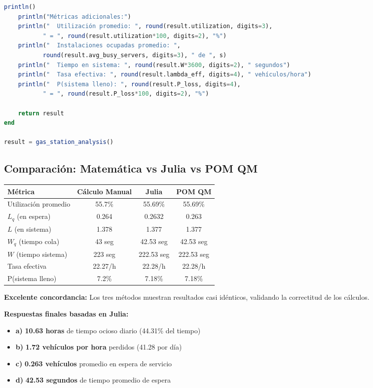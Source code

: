 \documentclass[12pt, a4paper, oneside]{book}
\theoremstyle{definition}
\begin{document}
\begin{center}
\begin{center}
\begin{center}
\begin{lstlisting}[language=Julia]
    println()
    println("Métricas adicionales:")
    println("  Utilización promedio: ", round(result.utilization, digits=3), 
           " = ", round(result.utilization*100, digits=2), "%")
    println("  Instalaciones ocupadas promedio: ", 
           round(result.avg_busy_servers, digits=3), " de ", s)
    println("  Tiempo en sistema: ", round(result.W*3600, digits=2), " segundos")
    println("  Tasa efectiva: ", round(result.lambda_eff, digits=4), " vehículos/hora")
    println("  P(sistema lleno): ", round(result.P_loss, digits=4), 
           " = ", round(result.P_loss*100, digits=2), "%")
    
    return result
end

result = gas_station_analysis()
\end{lstlisting}
\subsection{Comparación: Matemática vs Julia vs POM QM}

\begin{center}
\begin{tabular}{|l|c|c|c|}
\hline
\textbf{Métrica} & \textbf{Cálculo Manual} & \textbf{Julia} & \textbf{POM QM} \\
\hline
Utilización promedio & 55.7\% & 55.69\% & 55.69\% \\
$L_q$ (en espera) & 0.264 & 0.2632 & 0.263 \\
$L$ (en sistema) & 1.378 & 1.377 & 1.377 \\
$W_q$ (tiempo cola) & 43 seg & 42.53 seg & 42.53 seg \\
$W$ (tiempo sistema) & 223 seg & 222.53 seg & 222.53 seg \\
Tasa efectiva & 22.27/h & 22.28/h & 22.28/h \\
P(sistema lleno) & 7.2\% & 7.18\% & 7.18\% \\
\hline
\end{tabular}
\end{center}

\textbf{Excelente concordancia:} Los tres métodos muestran resultados casi idénticos, validando la correctitud de los cálculos.

\textbf{Respuestas finales basadas en Julia:}
\begin{itemize}
\item \textbf{a)} \textbf{10.63 horas} de tiempo ocioso diario (44.31\% del tiempo)
\item \textbf{b)} \textbf{1.72 vehículos por hora} perdidos (41.28 por día)
\item \textbf{c)} \textbf{0.263 vehículos} promedio en espera de servicio
\item \textbf{d)} \textbf{42.53 segundos} de tiempo promedio de espera
\end{itemize}


\end{center}
\end{center}
\end{center}
\end{document}
